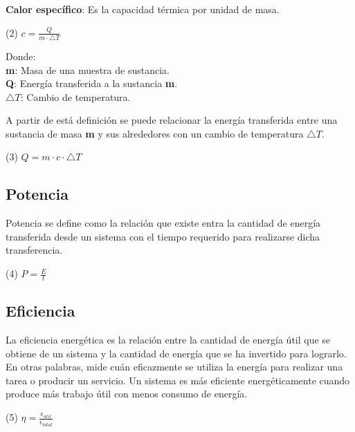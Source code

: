 \documentclass[]{article}
\begin{document}
\begin{flushleft}
	\textbf{Calor específico}: Es la capacidad térmica por unidad de masa.
	\begin{center}
		(2) $c = \frac{Q}{m \cdot \bigtriangleup T}$
	\end{center}
	
	\begin{flushleft}
		Donde: \\
		\textbf{m}: Masa de una muestra de sustancia. \\
		\textbf{Q}: Energía transferida a la sustancia \textbf{m}. \\
		\textbf{$\bigtriangleup T$}: Cambio de temperatura. \\
	\end{flushleft}
	
	\begin{flushleft}
		A partir de está definición se puede relacionar la energía transferida entre una sustancia de masa \textbf{m} y sus alrededores con un cambio de temperatura $\bigtriangleup T$.
		
		\begin{center}
			(3) $Q = m \cdot c \cdot \bigtriangleup T$
		\end{center}
	\end{flushleft}
\end{flushleft}

\subsection{Potencia}
Potencia se define como la relación que existe entra la cantidad de energía transferida desde un sistema con el tiempo requerido para realizarse dicha transferencia.

\begin{center}
	(4) $P = \frac{E}{t}$
\end{center}
\subsection{Eficiencia}
\begin{flushleft}
	La eficiencia energética es la relación entre la cantidad de energía útil que se obtiene de un sistema y la cantidad de energía que se ha invertido para lograrlo. En otras palabras, mide cuán eficazmente se utiliza la energía para realizar una tarea o producir un servicio. Un sistema es más eficiente energéticamente cuando produce más trabajo útil con menos consumo de energía.
\end{flushleft}
\begin{center}
	(5) $\eta = \frac{\epsilon_{util}}{\epsilon_{total}}$
\end{center}
\end{document}
